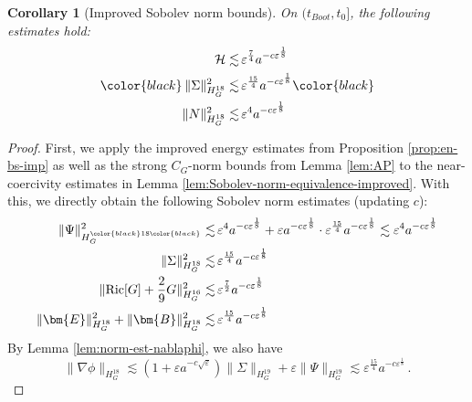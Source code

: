 \documentclass[11pt,leqno,textwidth=10cm]{amsart}
\numberwithin{equation}{section}
\theoremstyle{definition}
\theoremstyle{plain}
\newtheorem{corollary}[definition]{Corollary}
\newcommand{\1}{\mathbbm{1}}
\newcommand{\Ric}{\text{\normalfont{Ric}}}
\renewcommand{\epsilon}{\varepsilon}
\newcommand{\RE}{\bm{E}}
\newcommand{\RB}{\bm{B}}
\newcommand{\change}[1]{\color{black}#1\color{black}}
\begin{document}
\begin{corollary}[Improved Sobolev norm bounds]\label{cor:H-imp} On $(t_{Boot},t_0]$, the following estimates hold:
\begin{subequations}
\change{\begin{align}
\mathcal{H}\lesssim&\,\epsilon^\frac74 a^{-c\epsilon^\frac18}\label{eq:H-norm-imp}\\
\|\Sigma\|_{H^{18}_G}^2\lesssim&\,\epsilon^\frac{15}4a^{-c\epsilon^\frac18}\label{eq:H-Sigma-imp}\\
\|N\|_{H^{18}_G}^2\lesssim&\,\epsilon^4a^{-c\epsilon^\frac18}\label{eq:H-lapse-imp}
\end{align}}
\end{subequations}
\end{corollary}
\begin{proof}
First, we apply the improved energy estimates from \change{Proposition \ref{prop:en-bs-imp} }as well as the strong $C_G$-norm bounds from Lemma \ref{lem:AP} to the near-coercivity estimates in Lemma \ref{lem:Sobolev-norm-equivalence-improved}. With this, we directly obtain the following Sobolev norm estimates (updating $c$):
\change{\begin{align*}
\|\Psi\|_{H_G^{\change{18}}}^2\lesssim&\,\epsilon^4a^{-c\epsilon^\frac18}+\epsilon a^{-c\epsilon^\frac18}\cdot\epsilon^\frac{15}4a^{-c\epsilon^\frac18}\lesssim\epsilon^4a^{-c\epsilon^\frac18}\\
\|\Sigma\|_{H^{18}_G}^2\lesssim&\,\epsilon^\frac{15}4a^{-c\epsilon^\frac18}\\
\|\Ric[G]+\frac29G\|_{H^{16}_G}^2\lesssim&\,\epsilon^\frac72 a^{-c\epsilon^\frac18}\\
\|\RE\|_{H^{18}_G}^2+\|\RB\|_{H^{18}_G}^2\lesssim&\,\epsilon^\frac{15}4a^{-c\epsilon^\frac18}
\end{align*}}
\change{By Lemma \ref{lem:norm-est-nablaphi}, we also have
\begin{equation}\label{eq:nabla-phi-norm-imp}
\|\nabla\phi\|_{H^{18}_G}\lesssim \left(1+\epsilon a^{-c\sqrt{\epsilon}}\right)\|\Sigma\|_{H^{19}_G}+\epsilon\|\Psi\|_{H^{19}_G}\lesssim \epsilon^\frac{15}4a^{-c\epsilon^\frac18}\,.

\end{equation}}
\end{proof}
\end{document}
